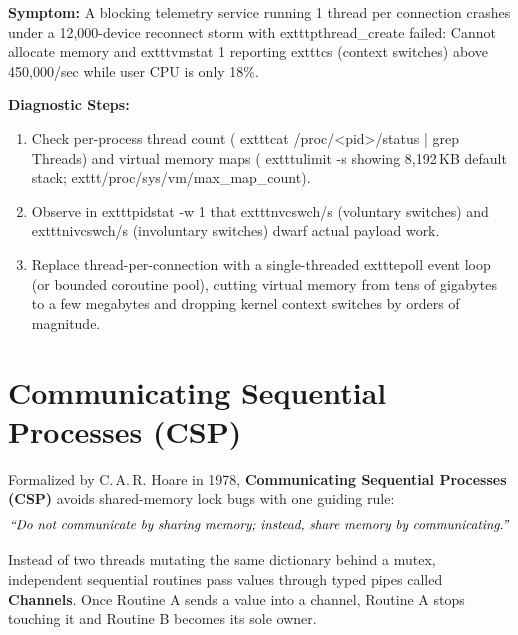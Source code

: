 \begin{realworldbox}
\textbf{Symptom:} A blocking telemetry service running 1 thread per connection crashes under a 12,000-device reconnect storm with 	exttt{pthread\_create failed: Cannot allocate memory} and 	exttt{vmstat 1} reporting 	exttt{cs} (context switches) above 450,000/sec while user CPU is only 18\%.

\textbf{Diagnostic Steps:}
\begin{enumerate}[leftmargin=15pt,itemsep=2pt]
  \item Check per-process thread count (	exttt{cat /proc/<pid>/status | grep Threads}) and virtual memory maps (	exttt{ulimit -s} showing 8,192\,KB default stack; 	exttt{/proc/sys/vm/max\_map\_count}).
  \item Observe in 	exttt{pidstat -w 1} that 	exttt{nvcswch/s} (voluntary switches) and 	exttt{nivcswch/s} (involuntary switches) dwarf actual payload work.
  \item Replace thread-per-connection with a single-threaded 	exttt{epoll} event loop (or bounded coroutine pool), cutting virtual memory from tens of gigabytes to a few megabytes and dropping kernel context switches by orders of magnitude.
\end{enumerate}
\end{realworldbox}

\section{Communicating Sequential Processes (CSP)}

Formalized by C.\,A.\,R. Hoare in 1978, \textbf{Communicating Sequential Processes (CSP)} avoids shared-memory lock bugs with one guiding rule:
$$\text{\textit{``Do not communicate by sharing memory; instead, share memory by communicating.''}}$$

Instead of two threads mutating the same dictionary behind a mutex, independent sequential routines pass values through typed pipes called \textbf{Channels}. Once Routine A sends a value into a channel, Routine A stops touching it and Routine B becomes its sole owner.

